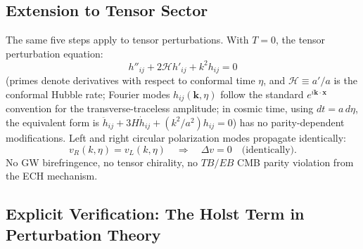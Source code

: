 \documentclass[aps,prd,twocolumn,superscriptaddress,showpacs,preprintnumbers,nofootinbib,longbibliography,floatfix]{revtex4-2}
\begin{document}
\subsection{Extension to Tensor Sector}

The same five steps apply to tensor perturbations. With $T=0$, the tensor
perturbation equation:
\begin{equation}
h''_{ij} + 2\mathcal{H}h'_{ij} + k^2 h_{ij} = 0
\end{equation}
(primes denote derivatives with respect to conformal time $\eta$, and
$\mathcal{H}\equiv a'/a$ is the conformal Hubble rate; Fourier modes
$h_{ij}(\mathbf{k},\eta)$ follow the standard
$e^{i\mathbf{k}\cdot\mathbf{x}}$ convention for the transverse-traceless
amplitude; in cosmic time, using $dt = a\,d\eta$, the
equivalent form is $\ddot h_{ij} + 3H\dot h_{ij} + (k^2/a^2)h_{ij}=0$)
has no parity-dependent modifications. Left and right circular polarization
modes propagate identically:
\begin{equation}
v_R(k,\eta) = v_L(k,\eta) \quad\Rightarrow\quad \Delta v = 0 \quad\text{(identically)}.
\end{equation}
No GW birefringence, no tensor chirality, no $TB/EB$ CMB parity violation from
the ECH mechanism.

\subsection{Explicit Verification: The Holst Term in Perturbation Theory}\label{sec:transp_holst}
\end{document}
